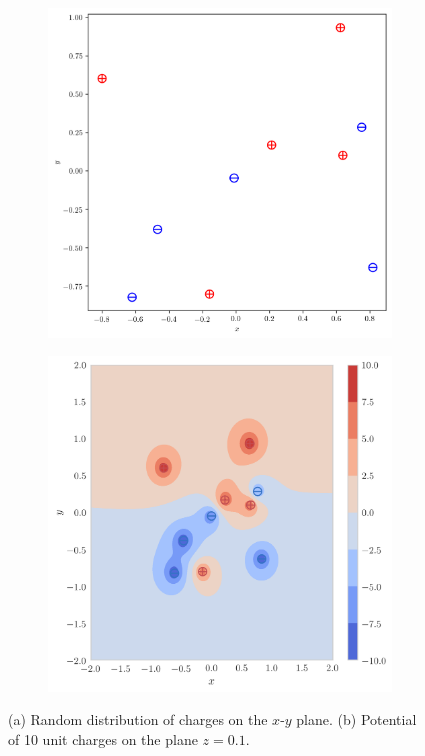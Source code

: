 \documentclass[10pt,a4paper,twoside]{article}
\begin{document}
\begin{figure}[tb]
    \centering
	\begin{subfigure}[h!]{0.45\textwidth}
		\centering
		\includegraphics[width=\textwidth]{113.png}
		\caption{}
		\label{fig:plane}
	\end{subfigure}
	\begin{subfigure}[h!]{0.45\textwidth}
		\centering
		\includegraphics[width=\textwidth]{115.png}
		\caption{}
		\label{fig:contour}
	\end{subfigure}
	\caption{(a) Random distribution of charges on the $x$-$y$ plane. (b) Potential of 10 unit charges on the plane $z=0.1$.}
	\label{fig:projections}
\end{figure}
\end{document}
